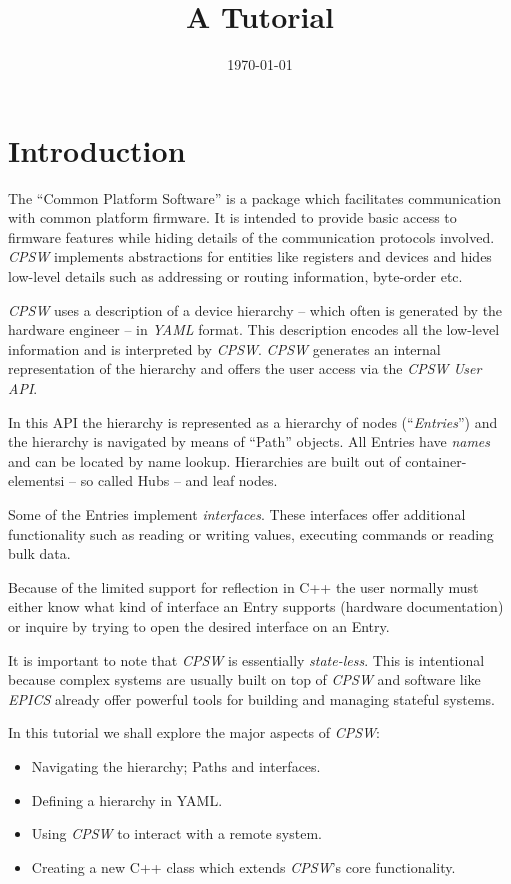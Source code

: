 \documentclass[10pt]{article}
\title{A \cpsw{} Tutorial}
\date{\today}
\newcommand{\ita}[1]{\emph{#1}}
\newcommand{\cpsw}      {\ita {CPSW}}
\newcommand{\yaml}      {\ita {YAML}}
\newcommand{\entry}     {{Entry}}
\newcommand{\entries}   {{Entries}}
\newcommand{\hub}       {{Hub}}
\newcommand{\Path}      {{Path}}
\newcommand{\cpp}       {C++}
\begin{document}
\maketitle

\section{Introduction}
The ``Common Platform Software'' is a package which facilitates communication with
common platform firmware. It is intended to provide basic access to firmware features
while hiding details of the communication protocols involved. \cpsw{} implements
abstractions for entities like registers and devices and hides low-level details such
as addressing or routing information, byte-order etc.

\cpsw{} uses a description of a device hierarchy -- which often is generated by the
hardware engineer -- in \yaml{} format. This description encodes all the low-level
information and is interpreted by \cpsw{}. \cpsw{} generates an internal representation
of the hierarchy and offers the user access via the {\em \cpsw{} User API}.

In this API the hierarchy is represented as a hierarchy of nodes (``{\em \entries}'')
and the hierarchy is navigated by means of ``\Path{}'' objects. All \entries{} have
{\em names} and can be located by name lookup. Hierarchies are built out of container-
elementsi -- so called \hub{}s -- and leaf nodes.

Some of the \entries{} implement {\em interfaces}. These interfaces offer additional
functionality such as reading or writing values, executing commands or reading bulk data.

Because of the limited support for reflection in \cpp{} the user normally must either
know what kind of interface an \entry{} supports (hardware documentation) or inquire
by trying to open the desired interface on an \entry{}.

It is important to note that \cpsw{} is essentially {\em state-less}. This is intentional
because complex systems are usually built on top of \cpsw{} and software like {\em EPICS}
already offer powerful tools for building and managing stateful systems.

In this tutorial we shall explore the major aspects of \cpsw:
\begin{itemize}
  \item  Navigating the hierarchy; \Path{}s and interfaces.
  \item  Defining a hierarchy in YAML.
  \item  Using \cpsw{} to interact with a remote system.
  \item  Creating a new \cpp{} class which extends \cpsw{}'s core functionality.
\end{itemize}
\end{document}
